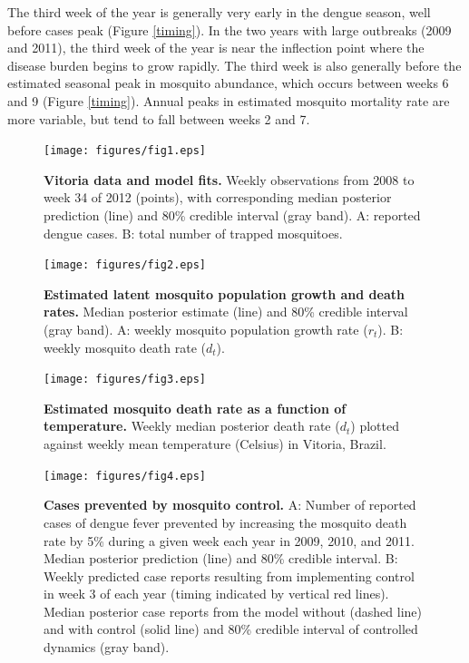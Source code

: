 \documentclass[10pt,letterpaper]{article}
\begin{document}
The third week of the year is generally very early in the dengue season, well before cases peak (Figure \ref{timing}).
In the two years with large outbreaks (2009 and 2011), the third week of the year is near the inflection point where the disease burden begins to grow rapidly.  
The third week is also generally before the estimated seasonal peak in mosquito abundance, which occurs between weeks 6 and 9 (Figure \ref{timing}).
Annual peaks in estimated mosquito mortality rate are more variable, but tend to fall between weeks 2 and 7.

\begin{figure}[!h]
\texttt{[image: figures/fig1.eps]}
\caption{{\bf Vitoria data and model fits.}
Weekly observations from 2008 to week 34 of 2012 (points), with corresponding median posterior prediction (line) and 80\% credible interval (gray band). A: reported dengue cases. B: total number of trapped mosquitoes.
}
\label{timeseries}
\end{figure}

\begin{figure}[!h]
\texttt{[image: figures/fig2.eps]}
\caption{{\bf Estimated latent mosquito population growth and death rates.}
Median posterior estimate (line) and 80\% credible interval (gray band).  A: weekly mosquito population growth rate ($r_t$). B: weekly mosquito death rate ($d_t$).
}
\label{latent}
\end{figure}

\begin{figure}[!h]
\texttt{[image: figures/fig3.eps]}
\caption{{\bf Estimated mosquito death rate as a function of temperature.}
Weekly median posterior death rate ($d_t$) plotted against weekly mean temperature (Celsius) in Vitoria, Brazil.
}
\label{temp}
\end{figure}

\begin{figure}[!h]
\texttt{[image: figures/fig4.eps]}
\caption{{\bf Cases prevented by mosquito control.}
A: Number of reported cases of dengue fever prevented by increasing the mosquito death rate by 5\% during a given week each year in 2009, 2010, and 2011. Median posterior prediction (line) and 80\% credible interval. B: Weekly predicted case reports resulting from implementing control in week 3 of each year (timing indicated by vertical red lines).  Median posterior case reports from the model without (dashed line) and with control (solid line) and 80\% credible interval of controlled dynamics (gray band).
}
\label{control}
\end{figure}
\end{document}
